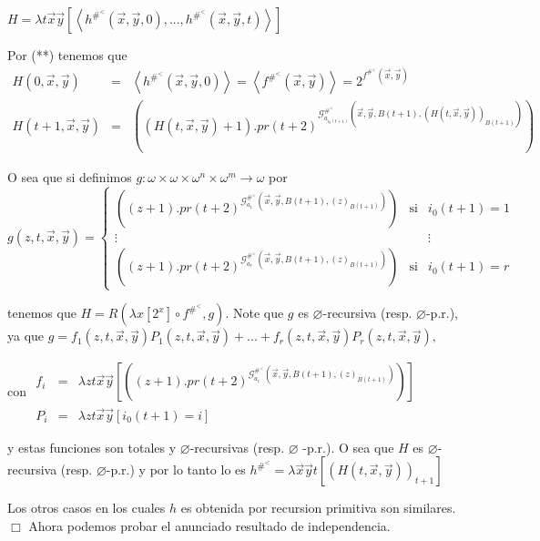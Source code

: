 \(\displaystyle H=\lambda t\vec{x}\vec{y}\left[ \left\langle h^{\#^{< }}(\vec{x},\vec{y} ,0),...,h^{\#^{< }}(\vec{x},\vec{y},t)\right\rangle \right] \)

Por (**) tenemos que
\(\displaystyle \begin{array}{rcl} H(0,\vec{x},\vec{y}) & =& \left\langle h^{\#^{< }}(\vec{x},\vec{y} ,0)\right\rangle =\left\langle f^{\#^{< }}(\vec{x},\vec{y})\right\rangle =2^{f^{\#^{< }}(\vec{x},\vec{y})} \\ H(t+1,\vec{x},\vec{y}) & =& \left( (H(t,\vec{x},\vec{y})+1).pr(t+2)^{\mathcal{G }_{a_{i_{0}(t+1)}}^{\#^{< }}(\vec{x},\vec{y},B(t+1),(H(t,\vec{x},\vec{y} ))_{B(t+1)})}\right) \end{array} \)

O sea que si definimos \(g:\omega \times \omega \times \omega ^{n}\times \omega ^{m}\rightarrow \omega \) por
\(\displaystyle g(z,t,\vec{x},\vec{y})=\left\{ \begin{array}{clc} \left( (z+1).pr(t+2)^{\mathcal{G}_{a_{1}}^{\#^{< }}(\vec{x},\vec{y} ,B(t+1),(z)_{B(t+1)})}\right) & \text{si} & i_{0}(t+1)=1 \\ \vdots & & \vdots \\ \left( (z+1).pr(t+2)^{\mathcal{G}_{a_{r}}^{\#^{< }}(\vec{x},\vec{y} ,B(t+1),(z)_{B(t+1)})}\right) & \text{si} & i_{0}(t+1)=r \end{array} \right. \)

tenemos que \(H=R(\lambda x\left[ 2^{x}\right] \circ f^{\#^{< }},g)\). Note que \(g\) es \(\varnothing \)-recursiva (resp. \(\varnothing \)-p.r.), ya que
\(\displaystyle g=f_{1}(z,t,\vec{x},\vec{y})P_{1}(z,t,\vec{x},\vec{y})+...+f_{r}(z,t,\vec{x}, \vec{y})P_{r}(z,t,\vec{x},\vec{y})\text{,} \)

con
\(\displaystyle \begin{array}{rcl} f_{i} & =& \lambda zt\vec{x}\vec{y}\left[ \left( (z+1).pr(t+2)^{\mathcal{G} _{a_{i}}^{\#^{< }}(\vec{x},\vec{y},B(t+1),(z)_{B(t+1)})}\right) \right] \\ P_{i} & =& \lambda zt\vec{x}\vec{y}\left[ i_{0}(t+1)=i\right] \end{array} \)

y estas funciones son totales y \(\varnothing \)-recursivas (resp. \(\varnothing \) -p.r.). O sea que \(H\) es \(\varnothing \)-recursiva (resp. \(\varnothing \)-p.r.) y por lo tanto lo es
\(\displaystyle h^{\#^{< }}=\lambda \vec{x}\vec{y}t\left[ (H(t,\vec{x},\vec{y}))_{t+1}\right] \)

Los otros casos en los cuales \(h\) es obtenida por recursion primitiva son similares. \(\Box\)
Ahora podemos probar el anunciado resultado de independencia.





